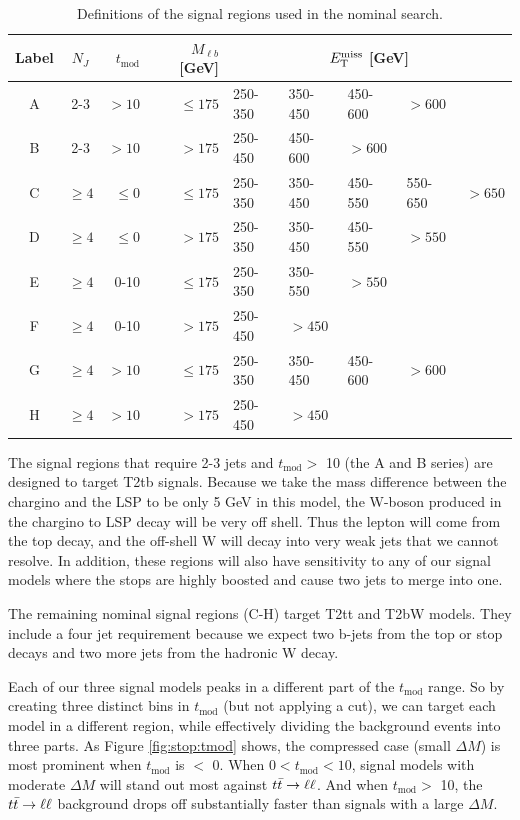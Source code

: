 \begin{table}[htb]
\centering
\caption{Definitions of the signal regions used in the nominal search.}
\label{tab:stop:nominalsrs}
\begin{tabular}{|c|c|r|r|lllll|}
\hline
Label & $N_J$ & $t_\text{mod}$ & $M_{\ell b}$ [GeV] & \multicolumn{5}{c|}{$E_\text{T}^\text{miss}$ [GeV]} \\
\hline
A & 2-3     & $>10$ & $\leq175$     & 250-350 & 350-450 & 450-600 & $>600$ & \\
B & 2-3     & $>10$ & $>175$        & 250-450 & 450-600 & $>600$ & & \\
C & $\geq4$ & $\leq0$ & $\leq175$   & 250-350 & 350-450 & 450-550 & 550-650 & $>650$ \\
D & $\geq4$ & $\leq0$ & $>175$      & 250-350 & 350-450 & 450-550 & $>550$ & \\
E & $\geq4$ & 0-10 & $\leq175$      & 250-350 & 350-550 & $>550$ & & \\
F & $\geq4$ & 0-10 & $>175$         & 250-450 & $>450$ & & & \\
G & $\geq4$ & $>10$ & $\leq175$     & 250-350 & 350-450 & 450-600 & $>600$ & \\
H & $\geq4$ & $>10$ & $>175$        & 250-450 & $>450$ & & & \\
\hline
\end{tabular}
\end{table}

The signal regions that require 2-3 jets and $t_\text{mod} >$ 10
(the A and B series) are
designed to target T2tb signals. Because we take the mass difference
between the chargino and the LSP to be only 5 GeV in this model, the
W-boson produced in the chargino to LSP decay will be very off
shell. Thus the lepton will come from the top decay, and the off-shell
W will decay into very weak jets that we cannot resolve. In addition,
these regions will also have sensitivity to any of our signal models
where the stops are highly boosted and cause two jets to merge into one.

The remaining nominal signal regions (C-H) target T2tt and T2bW
models. They include a four jet requirement because we expect two b-jets from the
top or stop decays and two more jets from the hadronic W decay.

Each of our three signal models peaks in a different part of the
$t_\text{mod}$ range. So by creating three distinct bins in
$t_\text{mod}$ (but not applying a cut), we can target each model in
a different region, while effectively dividing the background events into three
parts. As Figure \ref{fig:stop:tmod} shows, the compressed
case (small $\Delta M$) is most prominent when
$t_\text{mod}$ is $<$ 0. When $0 < t_\text{mod} < 10$, signal models
with moderate $\Delta M$ will stand out most against
$t\bar{t} \rightarrow \ell\ell$. And when $t_\text{mod} >$ 10, the $t\bar{t} \rightarrow \ell\ell$ background
drops off substantially faster than signals with a large $\Delta M$.

